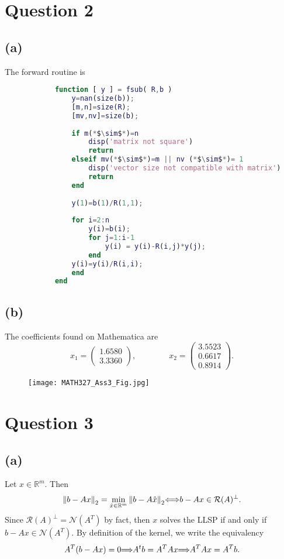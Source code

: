 \documentclass[12pt]{article}
\let\oldimplies\implies
\let\oldiff\iff
\renewcommand*{\implies}{
	\hspace{-0.05cm}\resizebox{.95\width}{\height}{$\oldimplies$}\hspace{-0.05cm}
}
\renewcommand*{\iff}{
	\hspace{-0.1cm}\oldiff\hspace{-0.1cm}
}
\begin{document}
	\section*{Question 2}
		\subsection*{(a)}
			The forward routine is 
			\begin{lstlisting}[language=Matlab, xleftmargin=-15em, showstringspaces=true]
			% Forward substitution
			function [ y ] = fsub( R,b )
				y=nan(size(b));
				[m,n]=size(R);
				[mv,nv]=size(b);
			
				if m(*$\sim$*)=n 
					disp('matrix not square')
					return
				elseif mv(*$\sim$*)=m || nv (*$\sim$*)= 1
					disp('vector size not compatible with matrix')
					return
				end
			
				y(1)=b(1)/R(1,1);
			
				for i=2:n
					y(i)=b(i);
					for j=1:i-1
						y(i) = y(i)-R(i,j)*y(j);
					end
				y(i)=y(i)/R(i,i);
				end
			end
			\end{lstlisting}
		\subsection*{(b)}
		The coefficients found on Mathematica are 
		$$ x_{1} = \begin{pmatrix}
			1.6580 \\ 3.3360
		\end{pmatrix} , \qquad \qquad x_{2} = \begin{pmatrix}
			3.5523 \\ 0.6617 \\ 0.8914
		\end{pmatrix}.$$
			\begin{figure}[H]
				\centering
				\texttt{[image: MATH327\_Ass3\_Fig.jpg]}
				\captionsetup{margin=1cm}
				\caption{}
			\end{figure}
	\section*{Question 3}
		\subsection*{(a)}
			Let $x \in \mathbb{R}^{m}$. Then 
			$$\norm{b- Ax}_{2} = \min\limits_{\hat{x} \in \mathbb{R}^{m}} \norm{b - A\hat{x}}_{2}  \iff b - Ax \in \mathcal{R}(A)^{\perp}.$$
			Since $\mathcal{R}(A)^{\perp} = \mathcal{N}(A^{T})$ by fact, then $x$ solves the LLSP if and only if $b - Ax \in \mathcal{N}(A^{T})$. By definition of the kernel, we write the equivalency
			$$ A^{T}(b - Ax) = 0 \implies A^{t}b = A^{T}Ax \implies A^{T}Ax = A^{T}b.$$
\end{document}
